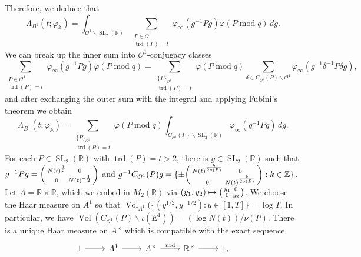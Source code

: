 \documentclass{article}
\theoremstyle{named}
\newcommand{\Z}{\mathbb{Z}}
\newcommand{\A}{\mathbb{A}}
\newcommand{\R}{\mathbb{R}}
\renewcommand{\O}{\mathcal{O}}
\DeclareMathOperator{\SL}{SL}
\DeclareMathOperator{\vol}{Vol}
\DeclareMathOperator{\modulo}{mod}
\DeclareMathOperator{\nrd}{nrd}
\DeclareMathOperator{\trd}{trd}
\begin{document}
Therefore, we deduce that 
\begin{equation*}
\Lambda_{B^1}(t; \varphi_\A) = \int_{\O^1 \backslash \SL_2(\R)} \sum_{\substack{P \in \O^1\\
\trd(P) = t}} \varphi_\infty(g^{-1}P g) \varphi(P \modulo q)\, dg.
\end{equation*}
We can break up the inner sum into $\O^1$-conjugacy classes 
\begin{equation*}
\sum_{\substack{P \in \O^1\\
\trd(P) = t}} \varphi_\infty(g^{-1}P g) \varphi(P \modulo q) = \sum_{\substack{\{P\}_{\O^1}\\
    \trd(P) = t}} \varphi(P \modulo q) \sum_{\delta \in C_{\O^1}(P)\backslash \O^1} \varphi_\infty(g^{-1}\delta^{-1}P \delta g),
\end{equation*}
and after exchanging the outer sum with the integral and applying Fubini's theorem we obtain
\begin{equation*}
    \Lambda_{B^1}(t; \varphi_\A) = \sum_{\substack{\{P\}_{\O^1}\\
    \trd(P) = t}} \varphi(P \modulo q) \int_{C_{\O^1}(P)\backslash \SL_2(\R)} \varphi_\infty(g^{-1}P g)\, dg.
\end{equation*}
For each $P\in \SL_2(\R)$ with $\trd(P) = t > 2$,  there is $g \in \SL_2(\R)$ such that $g^{-1}Pg = \begin{psmallmatrix}
    N(t)^{\frac{1}{2}} & 0\\
    0 & N(t)^{-\frac{1}{2}}
\end{psmallmatrix}$ and $g^{-1}C_{\O^1}(P)g = \{\pm \begin{psmallmatrix}
    N(t)^{\frac{k}{2\nu(P)}} & 0\\
    0 & N(t)^{\frac{k}{2\nu(P)}}\end{psmallmatrix}: k \in \Z\}$. Let $A = \R \times \R$, which we embed in $M_2(\R)$ via $(y_1, y_2)\mapsto \begin{psmallmatrix}
    y_1 & 0\\
    0 & y_2
    \end{psmallmatrix}$. We choose the Haar measure on $A^1$ so that $\vol_{A^1}(\{(y^{1/2}, y^{-1/2}): y \in [1, T]\} = \log T$. In particular,  we have $\vol(C_{\O^1}(P) \backslash \iota(E^1)) = (\log N(t))/\nu(P)$. There is a unique Haar measure on $A^\times$ which is compatible with the exact sequence 
    \begin{equation*}
\begin{tikzcd}
1 \arrow[r] & A^1 \arrow[r] & A^\times \arrow[r, "\nrd"] & \R^\times \arrow[r] & 1,
\end{tikzcd}
    \end{equation*}
\end{document}
